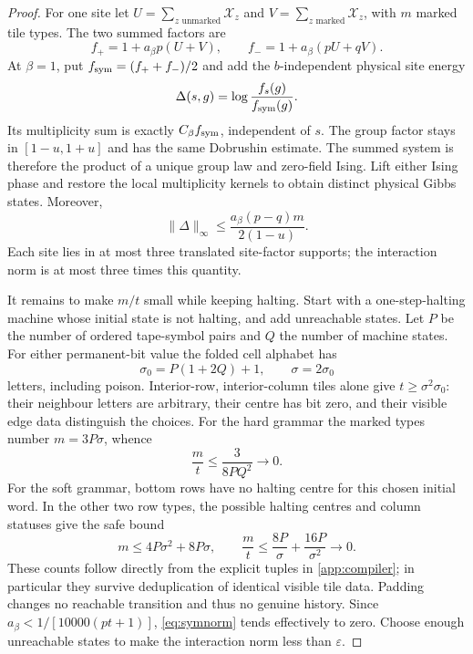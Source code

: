 \documentclass[11pt,reqno]{amsart}
\numberwithin{equation}{section}
\theoremstyle{definition}
\theoremstyle{remark}
\newcommand{\norm}[1]{\lVert#1\rVert}
\begin{document}
\begin{proof}
For one site let $U=\sum_{z\text{ unmarked}}\mathcal X_z$ and $V=\sum_{z\text{ marked}}\mathcal X_z$, with $m$ marked tile types. The two summed factors are
\[
 f_+=1+a_\beta p(U+V),\qquad
 f_-=1+a_\beta(pU+qV).
\]
At $\beta=1$, put $f_{\rm sym}=(f_++f_-)/2$ and add the $b$-independent physical site energy
\begin{equation}\label{eq:symenergy}
 \Delta(s,g)=\log\frac{f_s(g)}{f_{\rm sym}(g)}.
\end{equation}
Its multiplicity sum is exactly $C_\beta f_{\rm sym}$, independent of $s$. The group factor stays in $[1-u,1+u]$ and has the same Dobrushin estimate. The summed system is therefore the product of a unique group law and zero-field Ising. Lift either Ising phase and restore the local multiplicity kernels to obtain distinct physical Gibbs states. Moreover,
\begin{equation}\label{eq:symnorm}
 \norm\Delta_\infty\leq\frac{a_\beta(p-q)m}{2(1-u)}.
\end{equation}
Each site lies in at most three translated site-factor supports; the interaction norm is at most three times this quantity.

It remains to make $m/t$ small while keeping halting. Start with a one-step-halting machine whose initial state is not halting, and add unreachable states. Let $P$ be the number of ordered tape-symbol pairs and $Q$ the number of machine states. For either permanent-bit value the folded cell alphabet has
\[
 \sigma_0=P(1+2Q)+1,\qquad \sigma=2\sigma_0
\]
letters, including poison. Interior-row, interior-column tiles alone give $t\geq\sigma^2\sigma_0$: their neighbour letters are arbitrary, their centre has bit zero, and their visible edge data distinguish the choices. For the hard grammar the marked types number $m=3P\sigma$, whence
\[
 \frac mt\leq\frac{3}{8PQ^2}\longrightarrow0.
\]
For the soft grammar, bottom rows have no halting centre for this chosen initial word. In the other two row types, the possible halting centres and column statuses give the safe bound
\[
 m\leq4P\sigma^2+8P\sigma,\qquad
 \frac mt\leq\frac{8P}{\sigma}+\frac{16P}{\sigma^2}\longrightarrow0.
\]
These counts follow directly from the explicit tuples in \cref{app:compiler}; in particular they survive deduplication of identical visible tile data. Padding changes no reachable transition and thus no genuine history. Since $a_\beta<1/[10000(pt+1)]$, \eqref{eq:symnorm} tends effectively to zero. Choose enough unreachable states to make the interaction norm less than $\varepsilon$.
\end{proof}
\end{document}
